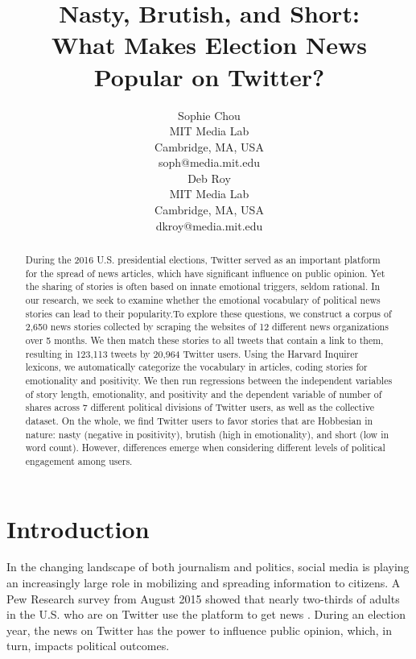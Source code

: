 \documentclass[letterpaper]{article}
\begin{document}
%
\title{Nasty, Brutish, and Short:\\
What Makes Election News Popular on Twitter?}
\author{Sophie Chou\\
MIT Media Lab\\
Cambridge, MA, USA\\
soph@media.mit.edu\\
\And
Deb Roy\\
MIT Media Lab\\
Cambridge, MA, USA\\
dkroy@media.mit.edu\\
}
\maketitle
\begin{abstract}
During the 2016 U.S. presidential elections, Twitter served as an important platform for the spread of news articles, which have significant influence on public opinion. Yet the sharing of stories is often based on innate emotional triggers, seldom rational. In our research, we seek to examine whether the emotional vocabulary of political news stories can lead to their popularity.To explore these questions, we construct a corpus of 2,650 news stories collected by scraping the websites of 12 different news organizations over 5 months. We then match these stories to all tweets that contain a link to them, resulting in 123,113 tweets by 20,964 Twitter users. Using the Harvard Inquirer lexicons, we automatically categorize the vocabulary in articles, coding stories for emotionality and positivity. We then run regressions between the independent variables of story length, emotionality, and positivity and the dependent variable of number of shares across 7 different political divisions of Twitter users, as well as the collective dataset. On the whole, we find Twitter users to favor stories that are Hobbesian in nature: nasty (negative in positivity), brutish (high in emotionality), and short (low in word count). However, differences emerge when considering different levels of political engagement among users.

\end{abstract}

 
\section{Introduction}
In the changing landscape of both journalism and politics, social media is playing an increasingly large role in mobilizing and spreading information to citizens. A Pew Research survey from August 2015 showed that nearly two-thirds of adults in the U.S. who are on Twitter use the platform to get news \cite{pew-Twitter-news}. During an election year, the news on Twitter has the power to influence public opinion, which, in turn, impacts political outcomes.
\end{document}
